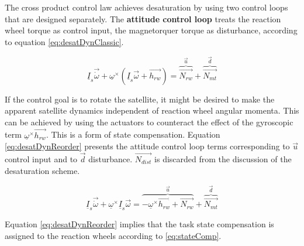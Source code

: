 The cross product control law achieves desaturation by using two control loops that are designed separately. The \textbf{attitude control loop} treats the reaction wheel torque as control input, the magnetorquer torque as disturbance, according to equation \ref{eq:desatDynClassic}.

\begin{equation}
\underline I_{s} \vec{\dot{\omega}} + \underline{\omega}^\times(\underline I_{s} \vec{\omega} + \vec{h_{rw}})  =    \overbrace{ \vec{N_{rw}}}^{\vec{u}} +  \overbrace{\vec{N_{mt}}}^{\vec{d}}
\label{eq:desatDynClassic}
\end{equation}




If the control goal is to rotate the satellite, it might be desired to make the apparent satellite dynamics independent of reaction wheel angular momenta. This can be achieved by using the actuators to counteract the effect of the gyroscopic term $\underline{\omega}^\times \vec{h_{rw}}$. This is a form of state compensation. Equation \ref{eq:desatDynReorder} presents the attitude control loop terms corresponding to $\vec{u}$ control input and to $\vec{d}$ disturbance. $\vec{N_{dist}}$ is discarded from the discussion of the desaturation scheme.

\begin{equation}
\underline I_{s} \vec{\dot{\omega}} + \underline{\omega}^\times\underline I_{s} \vec{\omega} =    \overbrace{-\underline{\omega}^\times\vec{h_{rw}} + \vec{N_{rw}}}^{\vec{u}} +  \overbrace{\vec{N_{mt}}}^{\vec{d}}
\label{eq:desatDynReorder}
\end{equation}

Equation \ref{eq:desatDynReorder} implies that the task state compensation is assigned to the reaction wheels according to \ref{eq:stateComp}.

